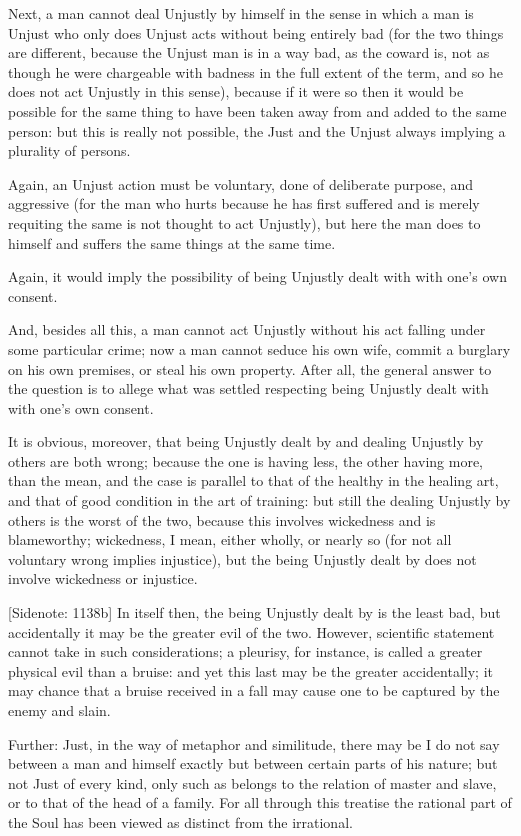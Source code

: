 Next, a man cannot deal Unjustly by himself in the sense in which a man
is Unjust who only does Unjust acts without being entirely bad (for the
two things are different, because the Unjust man is in a way bad, as the
coward is, not as though he were chargeable with badness in the full
extent of the term, and so he does not act Unjustly in this sense),
because if it were so then it would be possible for the same thing to
have been taken away from and added to the same person: but this is
really not possible, the Just and the Unjust always implying a plurality
of persons.

Again, an Unjust action must be voluntary, done of deliberate purpose,
and aggressive (for the man who hurts because he has first suffered and
is merely requiting the same is not thought to act Unjustly), but here
the man does to himself and suffers the same things at the same time.

Again, it would imply the possibility of being Unjustly dealt with with
one's own consent.

And, besides all this, a man cannot act Unjustly without his act falling
under some particular crime; now a man cannot seduce his own wife,
commit a burglary on his own premises, or steal his own property. After
all, the general answer to the question is to allege what was settled
respecting being Unjustly dealt with with one's own consent.

It is obvious, moreover, that being Unjustly dealt by and dealing
Unjustly by others are both wrong; because the one is having less, the
other having more, than the mean, and the case is parallel to that of
the healthy in the healing art, and that of good condition in the art of
training: but still the dealing Unjustly by others is the worst of the
two, because this involves wickedness and is blameworthy; wickedness, I
mean, either wholly, or nearly so (for not all voluntary wrong implies
injustice), but the being Unjustly dealt by does not involve wickedness
or injustice.

[Sidenote: 1138b] In itself then, the being Unjustly dealt by is the
least bad, but accidentally it may be the greater evil of the two.
However, scientific statement cannot take in such considerations; a
pleurisy, for instance, is called a greater physical evil than a bruise:
and yet this last may be the greater accidentally; it may chance that a
bruise received in a fall may cause one to be captured by the enemy and
slain.

Further: Just, in the way of metaphor and similitude, there may be I do
not say between a man and himself exactly but between certain parts of
his nature; but not Just of every kind, only such as belongs to the
relation of master and slave, or to that of the head of a family. For
all through this treatise the rational part of the Soul has been viewed
as distinct from the irrational.

